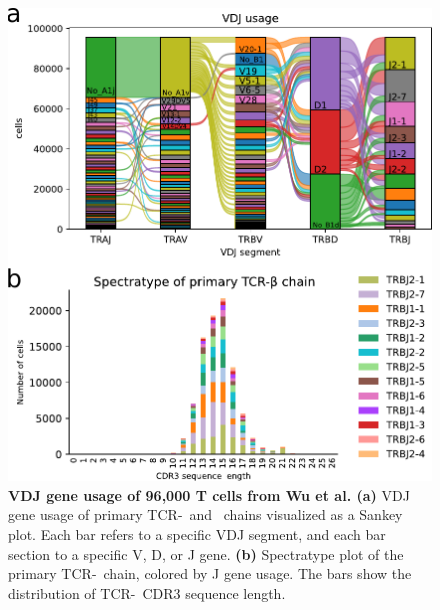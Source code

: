 \documentclass{article}
\begin{document}
\newpage
\begin{figure}[!ht]
  \centering
  \includegraphics[width=7in]{gene_usage.pdf}
  \caption{\textbf{VDJ gene usage of 96,000 T cells from Wu et al. \cite{Wu2020-vp}} \textbf{(a)} VDJ gene usage of primary TCR-\textalpha\ and \textbeta\ chains visualized as a Sankey plot. Each bar refers to a specific VDJ segment, and each bar section to a specific V, D, or J gene. \textbf{(b)} Spectratype plot of the primary TCR-\textbeta\ chain, colored by J gene usage. The bars show the distribution of TCR-\textbeta\ CDR3 sequence length.}
\end{figure}
\end{document}
